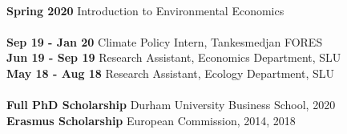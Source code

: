 \documentclass[12pt]{article}
\begin{document}
{\color{violet}{\large \sc Teaching}} \\
{\bf Spring 2020} Introduction to Environmental Economics \\

{\color{violet}{\large \sc Relevant Positions}} \\
{\bf Sep 19 - Jan 20} Climate Policy Intern, Tankesmedjan FORES \\
{\bf Jun 19 - Sep 19} Research Assistant, Economics Department, SLU \\
{\bf May 18 - Aug 18} Research Assistant, Ecology Department, SLU \\

{\color{violet}{\large \sc Grants and Scholarships}} \\
{\bf Full PhD Scholarship} Durham University Business School, 2020 \\
{\bf Erasmus Scholarship} European Commission, 2014, 2018

\end{document}

